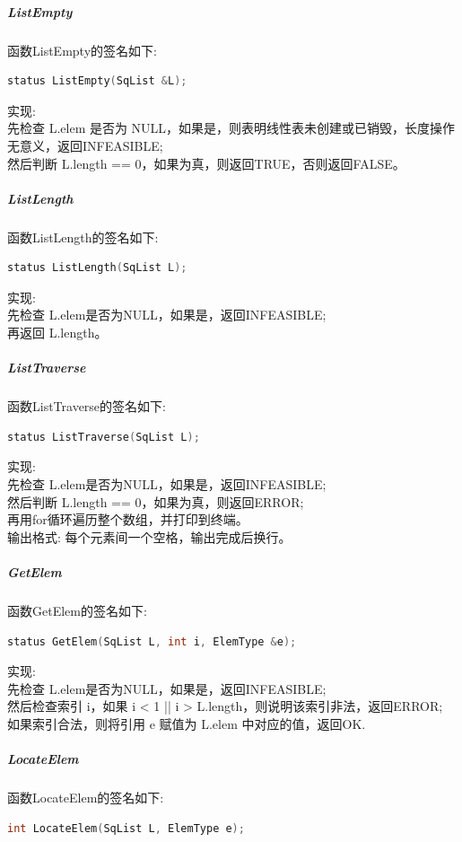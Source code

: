\documentclass[supercite]{Experimental_Report}
\theoremstyle{definition}
\begin{document}
\subparagraph{ListEmpty}
\noindent
函数ListEmpty的签名如下:
\begin{lstlisting}[language=C++, frame=single]
status ListEmpty(SqList &L);
\end{lstlisting}

\noindent
实现: \\
先检查 L.elem 是否为 NULL，如果是，则表明线性表未创建或已销毁，长度操作无意义，返回INFEASIBLE; \\
然后判断 L.length == 0，如果为真，则返回TRUE，否则返回FALSE。\\

\subparagraph{ListLength}
\noindent
函数ListLength的签名如下:
\begin{lstlisting}[language=C++, frame=single]
status ListLength(SqList L);
\end{lstlisting}

\noindent
实现: \\
先检查 L.elem是否为NULL，如果是，返回INFEASIBLE; \\
再返回 L.length。\\

\subparagraph{ListTraverse}
\noindent
函数ListTraverse的签名如下:
\begin{lstlisting}[language=C++, frame=single]
status ListTraverse(SqList L);
\end{lstlisting}

\noindent
实现: \\
先检查 L.elem是否为NULL，如果是，返回INFEASIBLE; \\
然后判断 L.length == 0，如果为真，则返回ERROR; \\
再用for循环遍历整个数组，并打印到终端。\\
输出格式: 每个元素间一个空格，输出完成后换行。\\

\subparagraph{GetElem}
\noindent
函数GetElem的签名如下:
\begin{lstlisting}[language=C++, frame=single]
status GetElem(SqList L, int i, ElemType &e);
\end{lstlisting}

\noindent
实现: \\
先检查 L.elem是否为NULL，如果是，返回INFEASIBLE; \\
然后检查索引 i，如果 i < 1 || i > L.length，则说明该索引非法，返回ERROR; \\
如果索引合法，则将引用 e 赋值为 L.elem 中对应的值，返回OK.\\

\subparagraph{LocateElem}
\noindent
函数LocateElem的签名如下:
\begin{lstlisting}[language=C++, frame=single]
int LocateElem(SqList L, ElemType e);
\end{lstlisting}
\end{document}
